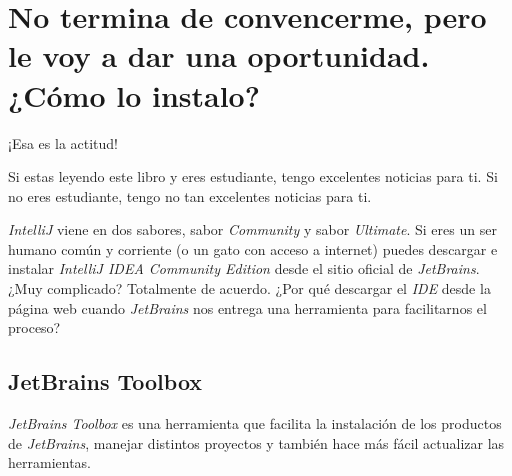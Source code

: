 \section{No termina de convencerme, pero le voy a dar una oportunidad. ¿Cómo lo instalo?}
  ¡Esa es la actitud!

  Si estas leyendo este libro y eres estudiante, tengo excelentes noticias para ti.
  Si no eres estudiante, tengo no tan excelentes noticias para ti.

  \textit{IntelliJ} viene en dos sabores, sabor \textit{Community} y sabor \textit{Ultimate}.
  Si eres un ser humano común y corriente (o un gato con acceso a internet) puedes descargar e 
  instalar \textit{IntelliJ IDEA Community Edition}\index{} desde el sitio oficial de \textit{JetBrains}.
  ¿Muy complicado?
  Totalmente de acuerdo.
  ¿Por qué descargar el \textit{IDE} desde la página web cuando \textit{JetBrains} nos entrega una
  herramienta para facilitarnos el proceso?
  
  \subsection{JetBrains Toolbox}
    \textit{JetBrains Toolbox} es una herramienta que facilita la instalación de los productos de
    \textit{JetBrains}, manejar distintos proyectos y también hace más fácil actualizar las
    herramientas.
